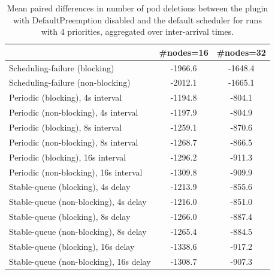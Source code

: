 \begin{table}[t]
\tiny
\setlength{\tabcolsep}{1.2pt}
\renewcommand{\arraystretch}{1.12}
\centering
\caption{Mean paired differences in number of pod deletions between the plugin with DefaultPreemption disabled and the default scheduler for runs with 4 priorities, aggregated over inter-arrival times.}
\label{tab:deletions-defpreempt0-prio4-std0-agg-arrival}
\begin{tabular}{l c c}
\toprule
 & \#nodes=16 & \#nodes=32 \\
\midrule
Scheduling-failure (blocking) & -1966.6 & -1648.4 \\
Scheduling-failure (non-blocking) & -2012.1 & -1665.1 \\
Periodic (blocking), 4s interval & -1194.8 & -804.1 \\
Periodic (non-blocking), 4s interval & -1197.9 & -804.9 \\
Periodic (blocking), 8s interval & -1259.1 & -870.6 \\
Periodic (non-blocking), 8s interval & -1268.7 & -866.5 \\
Periodic (blocking), 16s interval & -1296.2 & -911.3 \\
Periodic (non-blocking), 16s interval & -1309.8 & -909.9 \\
Stable-queue (blocking), 4s delay & -1213.9 & -855.6 \\
Stable-queue (non-blocking), 4s delay & -1216.0 & -851.0 \\
Stable-queue (blocking), 8s delay & -1266.0 & -887.4 \\
Stable-queue (non-blocking), 8s delay & -1265.4 & -884.5 \\
Stable-queue (blocking), 16s delay & -1338.6 & -917.2 \\
Stable-queue (non-blocking), 16s delay & -1308.7 & -907.3 \\
\bottomrule
\end{tabular}
\end{table}
